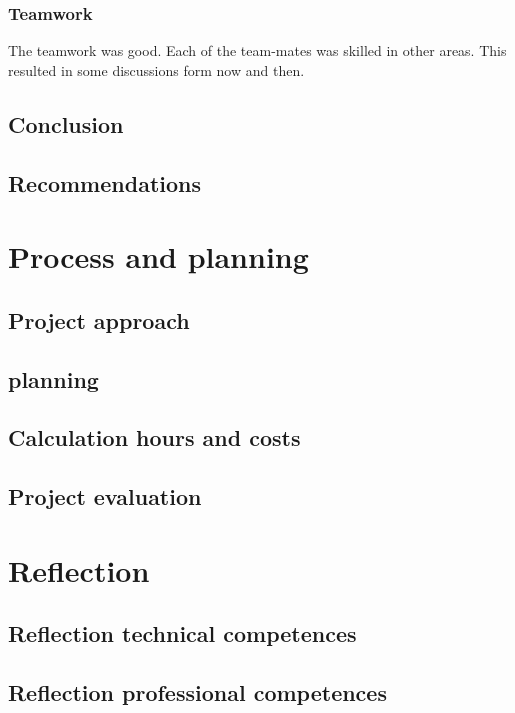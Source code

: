 \documentclass[12pt,a4paper]{report}
\begin{document}
\subsection{Teamwork}
The teamwork was good. 
Each of the team-mates was skilled in other areas.
This resulted in some discussions form now and then.

\section{Conclusion}

\newpage
\section{Recommendations}

\chapter{Process and planning}
\section{Project  approach}

\newpage
\section{planning}

\section{Calculation hours and costs}

\newpage
\section{Project evaluation}

\chapter{Reflection}
\section{Reflection technical competences}

\newpage
\section{Reflection professional competences}
\end{document}
